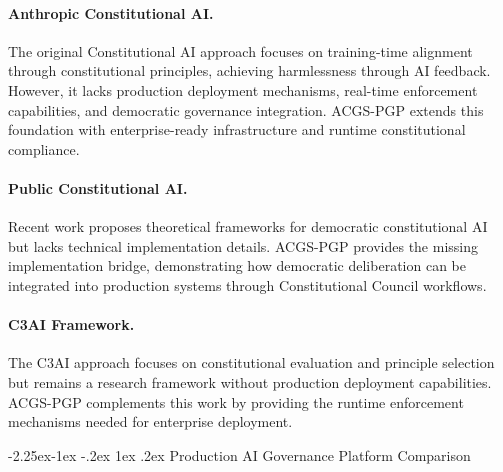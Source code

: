 \documentclass[manuscript,screen,9pt]{acmart}
\makeatletter
\renewcommand\subsection{\@startsection{subsection}{2}{\z@}%
  {-2.25ex\@plus -1ex \@minus -.2ex}%
  {1ex \@plus .2ex}%
  {\normalfont\large\bfseries}}
\makeatother
\begin{document}
\paragraph{Anthropic Constitutional AI.} The original Constitutional AI approach \citep{Bai2025ConstitutionalAI} focuses on training-time alignment through constitutional principles, achieving harmlessness through AI feedback. However, it lacks production deployment mechanisms, real-time enforcement capabilities, and democratic governance integration. ACGS-PGP extends this foundation with enterprise-ready infrastructure and runtime constitutional compliance.

\paragraph{Public Constitutional AI.} Recent work \citep{Abiri2024PublicConstitutionalAI} proposes theoretical frameworks for democratic constitutional AI but lacks technical implementation details. ACGS-PGP provides the missing implementation bridge, demonstrating how democratic deliberation can be integrated into production systems through Constitutional Council workflows.

\paragraph{C3AI Framework.} The C3AI approach \citep{C3AI2025Framework} focuses on constitutional evaluation and principle selection but remains a research framework without production deployment capabilities. ACGS-PGP complements this work by providing the runtime enforcement mechanisms needed for enterprise deployment.

\subsection{Production AI Governance Platform Comparison}
\end{document}
